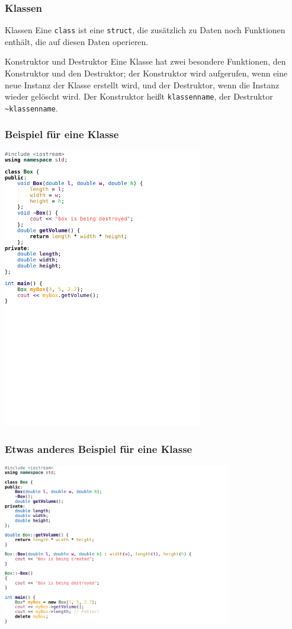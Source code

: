 \documentclass[18pt]{beamer}
\begin{document}
\begin{frame}
    \frametitle{Klassen}
    \begin{block}{Klassen}
    Eine \texttt{class} ist eine \texttt{struct}, die zusätzlich zu Daten noch Funktionen enthält, die auf diesen Daten operieren.
    \end{block}
    \begin{block}{Konstruktor und Destruktor}
    Eine Klasse hat zwei besondere Funktionen, den Konstruktor und den Destruktor; der Konstruktor wird aufgerufen, wenn eine neue Instanz der Klasse erstellt wird, und der Destruktor, wenn die Instanz wieder gelöscht wird. Der Konstruktor heißt \texttt{klassenname}, der Destruktor \texttt{\~{}klassenname}.
    \end{block}
\end{frame}
\begin{frame}
    \frametitle{Beispiel für eine Klasse}
    \vspace{0.7cm}
    \includegraphics[width=8.7cm]{example_code/box2.pdf}
\end{frame}
\begin{frame}
    \frametitle{Etwas anderes Beispiel für eine Klasse}
    \includegraphics[width=10.0cm]{example_code/box3.pdf}
\end{frame}

\end{document}
